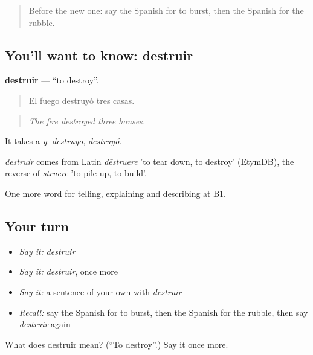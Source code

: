\label{lesson:ES-C529-destruir}



\begin{quote}
Before the new one: say the Spanish for to burst, then the Spanish for the rubble.
\end{quote}

\subsection*{You'll want to know: destruir}
\textbf{destruir} — \textquotedblleft{}to destroy\textquotedblright{}.

\begin{quote}
El fuego destruyó tres casas.
\end{quote}

\begin{quote}
\emph{The fire destroyed three houses.}
\end{quote}

It takes a \emph{y}: \emph{destruyo}, \emph{destruyó}.

\begin{cousinweb}
\emph{destruir} comes from Latin \emph{dēstruere} 'to tear down, to destroy' (EtymDB), the reverse of \emph{struere} 'to pile up, to build'.
\end{cousinweb}

\begin{grammarlens}[title={What you've built}]
One more word for telling, explaining and describing at B1.
\end{grammarlens}

\subsection*{Your turn}
\begin{itemize}
\raggedright
  \item \emph{Say it:} \emph{destruir}
  \item \emph{Say it:} \emph{destruir}, once more
  \item \emph{Say it:} a sentence of your own with \emph{destruir}
  \item \emph{Recall:} say the Spanish for to burst, then the Spanish for the rubble, then say \emph{destruir} again
\end{itemize}

\begin{tcolorbox}[breakable,colback=teal!4,colframe=teal!35!black,title={Before you move on}]
What does destruir mean? (\textquotedblleft{}To destroy\textquotedblright{}.) Say it once more.
\end{tcolorbox}
